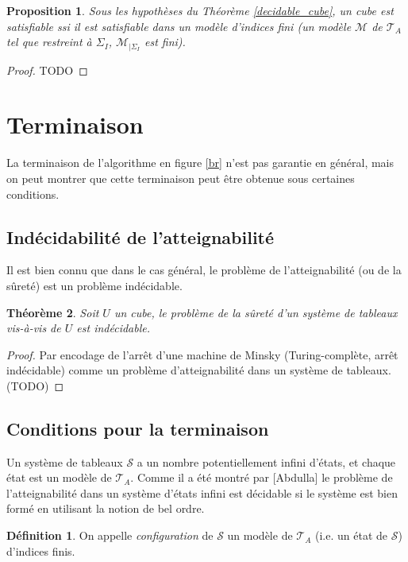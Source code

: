 \documentclass[a4paper, twoside]{scrartcl}
\theoremstyle{plain}%
\newtheorem{thm}{Théorème}[section]
\newtheorem{prop}[thm]{Proposition}
\theoremstyle{definition}
\newtheorem{defn}{Définition}[section]
\theoremstyle{remark}
\begin{document}
\begin{prop}
  Sous les hypothèses du Théorème \ref{decidable_cube}, un cube est
  satisfiable ssi il est satisfiable dans un modèle d'indices fini (un
  modèle $\mathcal{M}$ de $\mathcal{T}_A$ tel que restreint à
  $\Sigma_I$, $\mathcal{M}_{|\Sigma_I}$ est fini).
\end{prop}

\begin{proof} TODO
\end{proof}

\section{Terminaison}

La terminaison de l'algorithme en figure \ref{br} n'est pas garantie
en général, mais on peut montrer que cette terminaison peut être
obtenue sous certaines conditions.


\subsection{Indécidabilité de l'atteignabilité}

Il est bien connu que dans le cas général, le problème de
l'atteignabilité (ou de la sûreté) est un problème indécidable.

\begin{thm}
  Soit $U$ un cube, le problème de la sûreté d'un système de tableaux
  vis-à-vis de $U$ est \emph{indécidable}.
\end{thm}

\begin{proof}
  Par encodage de l'arrêt d'une machine de Minsky (Turing-complète,
  arrêt indécidable) comme un problème d'atteignabilité dans un
  système de tableaux. (TODO)
\end{proof}




\subsection{Conditions pour la terminaison}

Un système de tableaux $\mathcal{S}$ a un nombre potentiellement
infini d'états, et chaque état est un modèle de $\mathcal{T}_A$. Comme
il a été montré par [Abdulla] le problème de l'atteignabilité dans un
système d'états infini est décidable si le système est bien formé en
utilisant la notion de bel ordre.


\begin{defn}
  On appelle \emph{configuration} de $\mathcal{S}$ un modèle de
  $\mathcal{T}_A$ (i.e. un état de $\mathcal{S}$) d'indices finis.
\end{defn}
\end{document}
